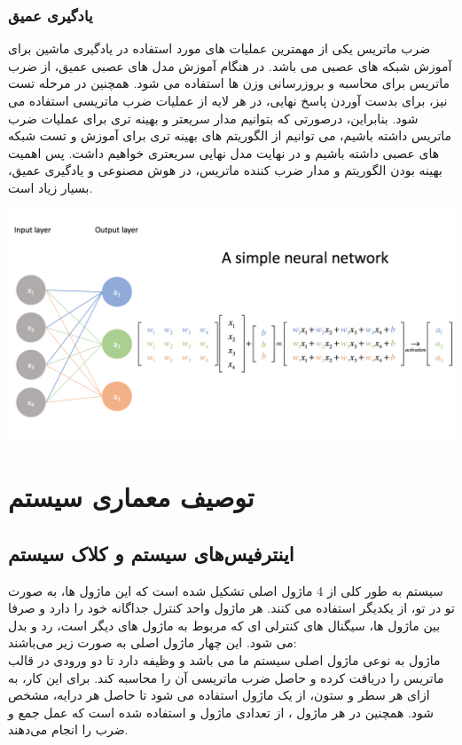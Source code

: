 \documentclass[12pt,titlepage,a4page , tikz , multi,table , svgnames,xcdraw]{article}
\begin{document}
\subsubsection{یادگیری عمیق}
	ضرب ماتریس یکی از مهمترین عملیات های مورد استفاده در یادگیری ماشین برای آموزش شبکه های عصبی می باشد. در هنگام آموزش مدل های عصبی عمیق، از ضرب ماتریس برای محاسبه و بروزرسانی وزن ها استفاده می شود. همچنین در مرحله تست نیز، برای بدست آوردن پاسخ نهایی، در هر لایه از عملیات ضرب ماتریسی استفاده می شود. بنابراین، درصورتی که بتوانیم مدار سریعتر و بهینه تری برای عملیات ضرب ماتریس داشته باشیم، می توانیم از الگوریتم های بهینه تری برای آموزش و تست شبکه های عصبی داشته باشیم و در نهایت مدل نهایی سریعتری خواهیم داشت. پس اهمیت بهینه بودن الگوریتم و مدار ضرب کننده ماتریس، در هوش مصنوعی و یادگیری عمیق، بسیار زیاد است.
    
\begin{center}
\includegraphics[scale=0.45] {Images/Introduction/Matrix_mult_deep_learning.png}\\
\end{center}


\newpage


\section{توصیف معماری سیستم}
\subsection{اینترفیس‌های سیستم و کلاک سیستم}
سیستم به طور کلی از 4 ماژول اصلی تشکیل شده است که این ماژول ها، به صورت تو در تو، از یکدیگر استفاده می کنند. هر ماژول واحد کنترل جداگانه خود را دارد و صرفا بین ماژول ها، سیگنال های کنترلی ای که مربوط به ماژول های دیگر است، رد و بدل می شود. این چهار ماژول اصلی به صورت زیر می‌باشند: \\ 
ماژول 
 به نوعی ماژول اصلی سیستم ما می باشد و وظیفه دارد تا دو ورودی در قالب ماتریس را دریافت کرده و حاصل ضرب ماتریسی آن را محاسبه کند. برای این کار، به ازای هر سطر و ستون، از یک ماژول 
  استفاده می شود تا حاصل هر درایه، مشخص شود. همچنین در هر ماژول 
، از تعدادی ماژول 
 و 
 استفاده شده است که عمل جمع و ضرب 
 را انجام می‌دهند.
	
\end{document}
